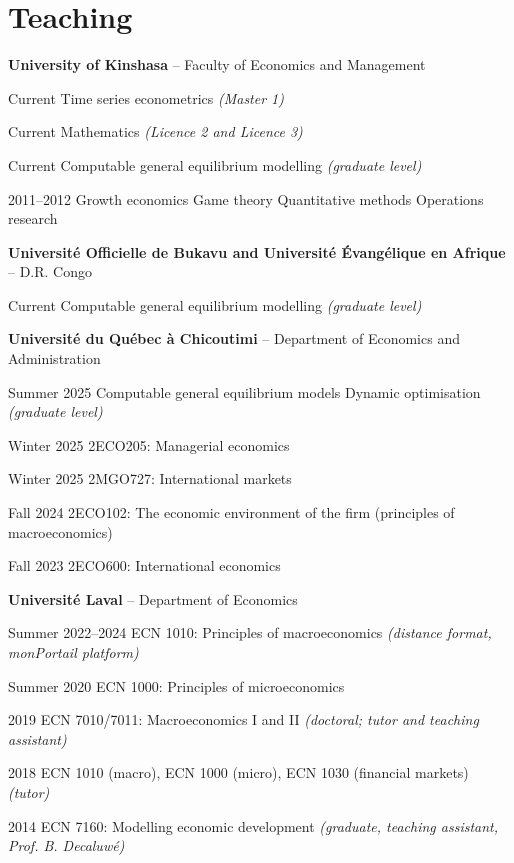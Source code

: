 \documentclass[11pt,letterpaper]{article}
\newenvironment{datelist}
  {\begin{description}[style=multiline,leftmargin=2.75cm,labelwidth=2.55cm,
     labelsep=0.2cm,font=\normalfont\small\color{soft},
     itemsep=0.45em,topsep=0.25em,parsep=0.15em]}
  {\end{description}}
\newcommand{\dotsep}{\;\textcolor{soft}{\textbullet}\;}
\newcommand{\meta}[1]{{\small\itshape\color{soft}#1}}
\begin{document}
\section{Teaching}
\textbf{University of Kinshasa} -- Faculty of Economics and Management
\begin{datelist}
  \item[Current] Time series econometrics \meta{(Master 1)}
  \item[Current] Mathematics \meta{(Licence 2 and Licence 3)}
  \item[Current] Computable general equilibrium modelling \meta{(graduate level)}
  \item[2011--2012] Growth economics \dotsep Game theory \dotsep Quantitative methods \dotsep Operations research
\end{datelist}
\textbf{Université Officielle de Bukavu and Université Évangélique en Afrique} -- D.R. Congo
\begin{datelist}
  \item[Current] Computable general equilibrium modelling \meta{(graduate level)}
\end{datelist}
\textbf{Université du Québec à Chicoutimi} -- Department of Economics and Administration
\begin{datelist}
  \item[Summer 2025] Computable general equilibrium models \dotsep Dynamic optimisation \meta{(graduate level)}
  \item[Winter 2025] 2ECO205: Managerial economics
  \item[Winter 2025] 2MGO727: International markets
  \item[Fall 2024] 2ECO102: The economic environment of the firm (principles of macroeconomics)
  \item[Fall 2023] 2ECO600: International economics
\end{datelist}
\textbf{Université Laval} -- Department of Economics
\begin{datelist}
  \item[Summer 2022--2024] ECN 1010: Principles of macroeconomics \meta{(distance format, monPortail platform)}
  \item[Summer 2020] ECN 1000: Principles of microeconomics
  \item[2019] ECN 7010/7011: Macroeconomics I and II \meta{(doctoral; tutor and teaching assistant)}
  \item[2018] ECN 1010 (macro), ECN 1000 (micro), ECN 1030 (financial markets) \meta{(tutor)}
  \item[2014] ECN 7160: Modelling economic development \meta{(graduate, teaching assistant, Prof. B. Decaluwé)}
\end{datelist}
\end{document}
